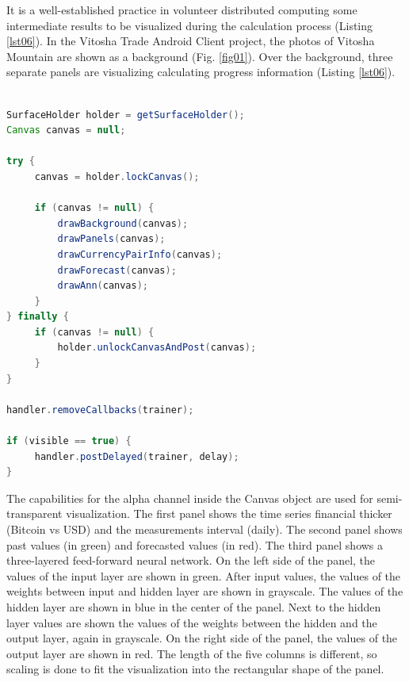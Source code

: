 \documentclass[a4paper,conference]{IEEEtran}
\begin{document}
It is a well-established practice in volunteer distributed computing some intermediate results to be visualized during the calculation process (Listing \ref{lst06}). In the Vitosha Trade Android Client project, the photos of Vitosha Mountain are shown as a background (Fig. \ref{fig01}). Over the background, three separate panels are visualizing calculating progress information (Listing \ref{lst06}).

\begin{lstlisting}[caption=Intermediate results visualization, language=Java, basicstyle=\tiny, label=lst06]

SurfaceHolder holder = getSurfaceHolder();
Canvas canvas = null;

try {
	 canvas = holder.lockCanvas();

	 if (canvas != null) {
	 	 drawBackground(canvas);
	 	 drawPanels(canvas);
	 	 drawCurrencyPairInfo(canvas);
	 	 drawForecast(canvas);
	 	 drawAnn(canvas);
	 }
} finally {
	 if (canvas != null) {
	 	 holder.unlockCanvasAndPost(canvas);
	 }
}

handler.removeCallbacks(trainer);

if (visible == true) {
	 handler.postDelayed(trainer, delay);
}

\end{lstlisting}

The capabilities for the alpha channel inside the Canvas object are used for semi-transparent visualization. The first panel shows the time series financial thicker (Bitcoin vs USD) and the measurements interval (daily). The second panel shows past values (in green) and forecasted values (in red). The third panel shows a three-layered feed-forward neural network. On the left side of the panel, the values of the input layer are shown in green. After input values, the values of the weights between input and hidden layer are shown in grayscale. The values of the hidden layer are shown in blue in the center of the panel. Next to the hidden layer values are shown the values of the weights between the hidden and the output layer, again in grayscale. On the right side of the panel, the values of the output layer are shown in red. The length of the five columns is different, so scaling is done to fit the visualization into the rectangular shape of the panel. 
\end{document}

